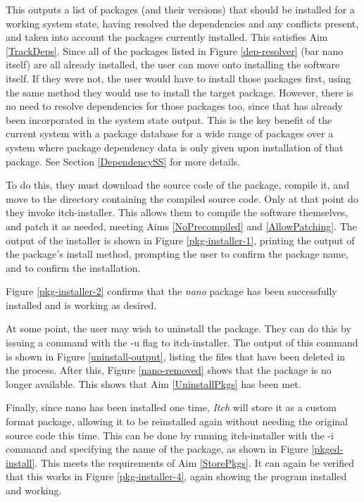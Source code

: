 \documentclass[10pt]{article}
\begin{document}
This outputs a list of packages (and their versions) that should be installed for a working system state, having resolved the dependencies and any conflicts present, and taken into account the packages currently installed. This satisfies Aim \ref{TrackDeps}. Since all of the packages listed in Figure \ref{dep-resolver} (bar nano itself) are all already installed, the user can move onto installing the software itself. If they were not, the user would have to install those packages first, using the same method they would use to install the target package. However, there is no need to resolve dependencies for those packages too, since that has already been incorporated in the system state output. This is the key benefit of the current system with a package database for a wide range of packages over a system where package dependency data is only given upon installation of that package. See Section \ref{DependencySS} for more details.

To do this, they must download the source code of the package, compile it, and move to the directory containing the compiled source code. Only at that point do they invoke itch-installer. This allows them to compile the software themselves, and patch it as needed, meeting Aims \ref{NoPrecompiled} and \ref{AllowPatching}. The output of the installer is shown in Figure \ref{pkg-installer-1}, printing the output of the package's install method, prompting the user to confirm the package name, and to confirm the installation.

Figure \ref{pkg-installer-2} confirms that the \textit{nano} package has been successfully installed and is working as desired.

At some point, the user may wish to uninstall the package. They can do this by issuing a command with the -u flag to itch-installer. The output of this command is shown in Figure \ref{uninstall-output}, listing the files that have been deleted in the process. After this, Figure \ref{nano-removed} shows that the package is no longer available. This shows that Aim \ref{UninstallPkgs} has been met.

Finally, since nano has been installed one time, \textit{Itch} will store it as a custom format package, allowing it to be reinstalled again without needing the original source code this time. This can be done by running itch-installer with the -i command and specifying the name of the package, as shown in Figure \ref{pkged-install}. This meets the requirements of Aim \ref{StorePkgs}. It can again be verified that this works in Figure \ref{pkg-installer-4}, again showing the program installed and working.
\end{document}
